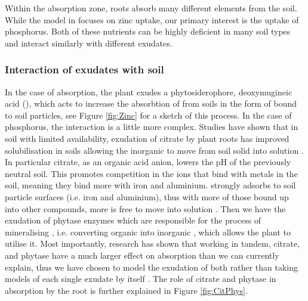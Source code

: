 \documentclass[11pt]{article}
\numberwithin{equation}{section}
\begin{document}
Within the absorption zone, roots absorb many different elements from the soil. While the model in \cite{Ptashnyk-2011} focuses on zinc uptake, our primary interest is the uptake of phosphorus. Both of these nutrients can be highly deficient in many soil types and interact similarly with different exudates.



\subsubsection{Interaction of exudates with soil}

In the case of   absorption, the plant exudes a phytosiderophore, deoxymugineic acid (), which acts to increase the absorbtion of  from soils in the form of  bound to soil particles, see Figure \ref{fig:Zinc} for a sketch of this process. In the case of phosphorus, the interaction is a little more complex. Studies have shown that in soil with limited  availability, exudation of citrate by plant roots has improved  solubilisation in soils
allowing the inorganic  to move from soil solid into solution \cite{McKayFletcher-2019}. In particular citrate, as an organic acid anion, lowers the pH of the previously neutral soil. This promotes competition in the ions that bind with metals in the soil, meaning they bind more with iron and aluminium.  strongly adsorbs to soil particle surfaces (i.e. iron and aluminium), thus with more of those bound up into other compounds, more  is free to move into solution \cite{McKayFletcher-2019}.
Then we have the exudation of phytase enzymes which are responsible for the process of mineralising , i.e. converting organic  into inorganic , which allows the plant to utilise it. Most importantly, research has shown that working in tandem, citrate, and phytase have a much larger effect on  absorption than we can currently explain, thus we have chosen to model the exudation of both rather than taking models of each single exudate by itself \cite{giles_george}. The role of citrate and phytase in  absorption by the root is further explained in Figure \ref{fig:CitPhys}.
\end{document}
